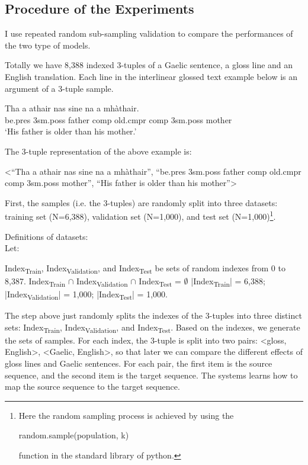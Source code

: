 \documentclass[final]{ua-thesis}
\numberwithin{equation}{section}
\begin{document}
\subsection{Procedure of the Experiments}
I use repeated random sub-sampling validation to compare the performances of the two type of models.

Totally we have 8,388 indexed 3-tuples of a Gaelic sentence, a gloss line and an English translation. Each line in the interlinear glossed text example below is an argument of a 3-tuple sample.

\begin{exe} 
\ex \gll    Tha a athair nas sine na a mh\`athair.\\ 
           be.pres 3sm.poss father comp old.cmpr comp 3sm.poss mother
\\ 
   \glt    `His father is older than his mother.' 
\end{exe}

The 3-tuple representation of the above example is:
\begin{exe}
\ex <``Tha a athair nas sine na a mh\`athair'', ``be.pres 3sm.poss father comp old.cmpr comp 3sm.poss mother'', ``His father is older than his mother''>
\end{exe}

First, the samples (i.e. the 3-tuples) are randomly split into three datasets: training set (N=6,388), validation set (N=1,000), and test set (N=1,000)\footnote{Here the random sampling process is achieved by using the \begin{myfont}random.sample(population, k)\end{myfont} function in the standard library of python.}.

\begin{exe}
\ex Definitions of datasets:\\
	Let:
	\begin{xlist}
	\ex 	Index\textsubscript{Train}, Index\textsubscript{Validation}, and Index\textsubscript{Test} be sets of random indexes from 0 to 8,387.
   \ex		Index\textsubscript{Train} $\cap$ Index\textsubscript{Validation} $\cap$ Index\textsubscript{Test} = $\emptyset$
   \ex 	|Index\textsubscript{Train}| = 6,388; |Index\textsubscript{Validation}| = 1,000; |Index\textsubscript{Test}| = 1,000.
   \end{xlist}
\end{exe}
The step above just randomly splits the indexes of the 3-tuples into three distinct sets: Index\textsubscript{Train}, Index\textsubscript{Validation}, and Index\textsubscript{Test}. Based on the indexes, we generate the sets of samples. For each index, the 3-tuple is split into two pairs: <gloss, English>, <Gaelic, English>, so that later we can compare the different effects of gloss lines and Gaelic sentences. For each pair, the first item is the source sequence, and the second item is the target sequence. The systems learns how to map the source sequence to the target sequence.   
\end{document}
